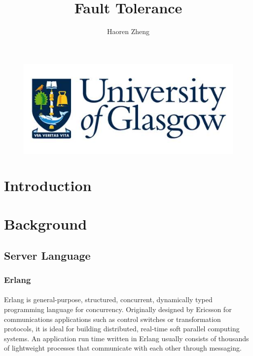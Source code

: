 \documentclass{article}
\title{Fault Tolerance}
\author{Haoren Zheng}
\begin{document}
\begin{titlepage}
\begin{figure}[ht]
\includegraphics[scale=1]{Title.JPG}
\maketitle
\end{figure}
\end{titlepage}
\begin{abstract}
\end{abstract}
\tableofcontents
\section{Introduction}\vspace{24pt}
\section{Background}\vspace{24pt}
\subsection{Server Language}\vspace{18pt}
\subsubsection{Erlang}\vspace{16pt}
\paragraph{}\vspace{11pt}\justifying
Erlang is general-purpose, structured, concurrent, dynamically typed programming language for concurrency\cite{armstrong1993concurrent}. Originally designed by Ericsson for communications applications such as control switches or transformation protocols, it is ideal for building distributed, real-time soft parallel computing systems. An application run time written in Erlang usually consists of thousands of lightweight processes that communicate with each other through messaging.\\
\end{document}
